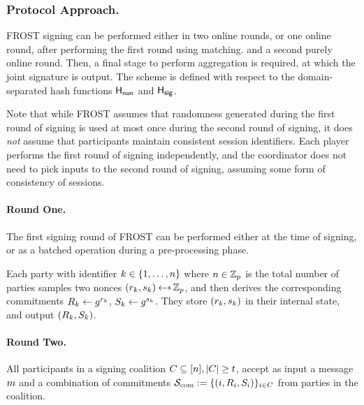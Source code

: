 \subsubsection{Protocol Approach.}

FROST signing can be performed either in two online rounds,
or one online round,
after performing the first round using matching.
and a second purely online round.
Then, a final stage to perform aggregation is required,
at which the joint signature is output.
The scheme is defined with respect to the domain-separated hash functions $\mathsf{H_{non}}$ and $\mathsf{H_{sig}}$.

Note that while FROST assumes that randomness generated during the first round of signing is used at most once during the second round of signing,
it does \emph{not} assume that participants maintain consistent session identifiers.
Each player performs the first round of signing independently,
and the coordinator does not need to pick inputs to the second round of signing,
assuming some form of consistency of sessions.

\paragraph{Round One.}
The first signing round of FROST can be performed either at the time of signing,
or as a batched operation during a pre-processing phase.

Each party with identifier $k \in \{ 1, \ldots, n\} $ where $n \in \mathbb{Z}_p$ is the total number of parties
samples two nonces $(r_{\partyid},  s_{\partyid}) \randpick \Zp$,
and then derives the corresponding commitments $R_{k} \gets g^{r_{k}}$, $ S_{k} \gets  g^{s_{k}}$.
They store $(r_{k}, s_{k})$ in their internal state,
and output $(R_{k}, S_{k})$.

\paragraph{Round Two.}
All participants in a signing coalition $C \subseteq [n], \lvert C \rvert \geq t$,
accept as input a message $m$ and a combination of commitments $\mathcal{S}_{\rm com} := \{ (i, R_{i}, S_{i})\}_{i \in C}$ from parties in the coalition.

